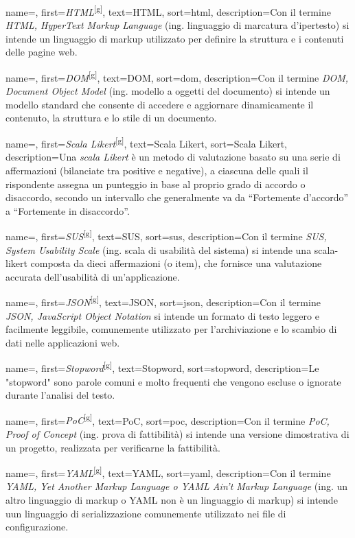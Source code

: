  {
    name=,
    first={\textit{HTML}\textsuperscript{[g]}},
    text=HTML,
    sort=html,
    description={Con il termine \emph{HTML, HyperText Markup Language} (ing. linguaggio di marcatura d'ipertesto) si intende un linguaggio di markup utilizzato per definire la struttura e i contenuti delle pagine web.}
}

 {
    name=,
    first={\textit{DOM}\textsuperscript{[g]}},
    text=DOM,
    sort=dom,
    description={Con il termine \emph{DOM, Document Object Model} (ing. modello a oggetti del documento) si intende un modello standard che consente di accedere e aggiornare dinamicamente il contenuto, la struttura e lo stile di un documento.}
}

 {
    name=,
    first={\textit{Scala Likert}\textsuperscript{[g]}},
    text=Scala Likert,
    sort=Scala Likert,
    description={Una \emph{scala Likert} è un metodo di valutazione basato su una serie di affermazioni (bilanciate tra positive e negative), a ciascuna delle quali il rispondente assegna un punteggio in base al proprio grado di accordo o disaccordo, secondo un intervallo che generalmente va da “Fortemente d'accordo” a “Fortemente in disaccordo”.}
}

 {
    name=,
    first={\textit{SUS}\textsuperscript{[g]}},
    text=SUS,
    sort=sus,
    description={Con il termine \emph{SUS, System Usability Scale} (ing. scala di usabilità del sistema) si intende una \gls{scala-likert} composta da dieci affermazioni (o item), che fornisce una valutazione accurata dell'usabilità di un'applicazione.}
}

 {
    name=,
    first={\textit{JSON}\textsuperscript{[g]}},
    text=JSON,
    sort=json,
    description={Con il termine \emph{JSON, JavaScript Object Notation} si intende un formato di testo leggero e facilmente leggibile, comunemente utilizzato per l’archiviazione e lo scambio di dati nelle applicazioni web.}
}

 {
    name=,
    first={\textit{Stopword}\textsuperscript{[g]}},
    text=Stopword,
    sort=stopword,
    description={Le "stopword" sono parole comuni e molto frequenti che vengono escluse o ignorate durante l’analisi del testo.}
}

 {
    name=,
    first={\textit{PoC}\textsuperscript{[g]}},
    text=PoC,
    sort=poc,
    description={Con il termine \emph{PoC, Proof of Concept} (ing. prova di fattibilità) si intende una versione dimostrativa di un progetto, realizzata per verificarne la fattibilità.}
}

 {
    name=,
    first={\textit{YAML}\textsuperscript{[g]}},
    text=YAML,
    sort=yaml,
    description={Con il termine \emph{YAML, Yet Another Markup Language o YAML Ain’t Markup Language} (ing. un altro linguaggio di markup o YAML non è un linguaggio di markup) si intende uun linguaggio di serializzazione comunemente utilizzato nei file di configurazione.}
}
